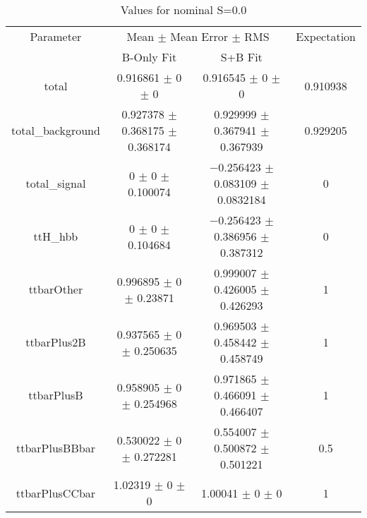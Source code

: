 \begin{table}
\centering
\caption{Values for nominal S=0.0}
\begin{tabular}{cccc}
\toprule
Parameter & \multicolumn{2}{c}{Mean $\pm$ Mean Error $\pm$ RMS} & Expectation\\
 & B-Only Fit & S+B Fit & \\
\midrule
total & \num{0.916861} $\pm$ \num{0} $\pm$ \num{0} & \num{0.916545} $\pm$ \num{0} $\pm$ \num{0} & \num{0.910938}\\
total\_background & \num{0.927378} $\pm$ \num{0.368175} $\pm$ \num{0.368174} & \num{0.929999} $\pm$ \num{0.367941} $\pm$ \num{0.367939} & \num{0.929205}\\
total\_signal & \num{0} $\pm$ \num{0} $\pm$ \num{0.100074} & \num{-0.256423} $\pm$ \num{0.083109} $\pm$ \num{0.0832184} & \num{0}\\
ttH\_hbb & \num{0} $\pm$ \num{0} $\pm$ \num{0.104684} & \num{-0.256423} $\pm$ \num{0.386956} $\pm$ \num{0.387312} & \num{0}\\
ttbarOther & \num{0.996895} $\pm$ \num{0} $\pm$ \num{0.23871} & \num{0.999007} $\pm$ \num{0.426005} $\pm$ \num{0.426293} & \num{1}\\
ttbarPlus2B & \num{0.937565} $\pm$ \num{0} $\pm$ \num{0.250635} & \num{0.969503} $\pm$ \num{0.458442} $\pm$ \num{0.458749} & \num{1}\\
ttbarPlusB & \num{0.958905} $\pm$ \num{0} $\pm$ \num{0.254968} & \num{0.971865} $\pm$ \num{0.466091} $\pm$ \num{0.466407} & \num{1}\\
ttbarPlusBBbar & \num{0.530022} $\pm$ \num{0} $\pm$ \num{0.272281} & \num{0.554007} $\pm$ \num{0.500872} $\pm$ \num{0.501221} & \num{0.5}\\
ttbarPlusCCbar & \num{1.02319} $\pm$ \num{0} $\pm$ \num{0} & \num{1.00041} $\pm$ \num{0} $\pm$ \num{0} & \num{1}\\
\bottomrule
\end{tabular}
\end{table}